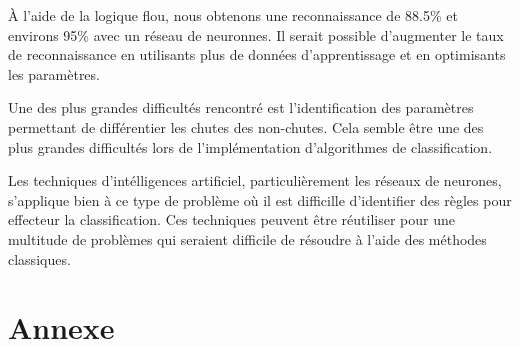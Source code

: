 \documentclass[12pt,letterpaper]{article}
\begin{document}
À l'aide de la logique flou, nous obtenons une reconnaissance de 88.5\% et environs 95\% avec un réseau de neuronnes. Il serait possible d'augmenter le taux de reconnaissance en utilisants plus de données d'apprentissage et en optimisants les paramètres. 

Une des plus grandes difficultés rencontré est l'identification des paramètres permettant de différentier les chutes des non-chutes. Cela semble être une des plus grandes difficultés lors de l'implémentation d'algorithmes de classification.

Les techniques d'intélligences artificiel, particulièrement les réseaux de neurones, s'applique bien à ce type de problème où il est difficille d'identifier des règles pour effecteur la classification. Ces techniques peuvent être réutiliser pour une multitude de problèmes qui seraient difficile de résoudre à l'aide des méthodes classiques. 

\pagebreak
\section{Annexe}
\end{document}
